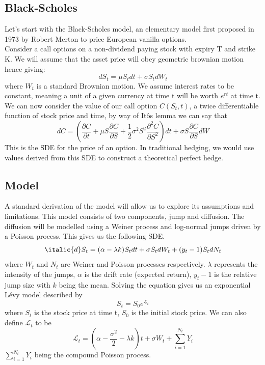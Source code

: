 \documentclass[12pt]{article}
\numberwithin{equation}{section}
\begin{document}
\subsection{Black-Scholes}
Let's start with the Black-Scholes model, an elementary model first proposed in 
1973 by Robert Merton to price European vanilla options. \autocite{blackscholes} \\
Consider a call options on a non-dividend paying stock with expiry T and strike K. 
We will assume that the asset price will obey geometric brownian motion hence 
giving: 
\begin{equation}
dS_t = \mu {S_t} dt + \sigma S_t dW_t
\end{equation}
where $W_t$ is a standard Brownian motion. We assume interest rates to be constant,
meaning a unit of a given currency at time t will be worth $e^{rt}$ at time t.\\
We can now consider the value of our call option $C(S_t,t)$, a twice differentiable 
function of stock price and time, by way of It\^{o}s 
lemma
we can say that 
\begin{equation}
dC = \left( \frac{\partial C}{\partial t} + \mu S \frac{\partial C}{\partial S} + \frac{1}{2} \sigma^2 S^2 \frac{\partial^2 C}{\partial S^2} \right) dt + \sigma S \frac{\partial C}{\partial S} dW
\end{equation}
This is the SDE for the price of an option. In traditional hedging, we would use 
values derived from this SDE to construct a theoretical perfect hedge. 
\subsection{Model}
A standard derivation of the model will allow us to explore its assumptions and 
limitations. This model consists of two components, jump and diffusion. The 
diffusion will be modelled using a Weiner process and log-normal jumps driven 
by a Poisson process\autocite{matsuda}. This gives us the following
SDE. 
\begin{equation}
  \italic{d}S_t = (\alpha - \lambda k)S_tdt + \sigma S_t dW_t + (y_t-1)S_tdN_t
\end{equation}
where $W_t \text{ and } N_t$ are Weiner and Poisson processes respectively. 
$\lambda$ represents the intensity of the jumps, $\alpha$ is the drift rate
(expected return), $y_t - 1$ is the relative jump size with $k$ being the mean. 
Solving the equation gives us an exponential L\'{e}vy model described by 
\begin{equation}
  S_t = S_0e^{\mathcal{L}_t}
\end{equation}
where $S_t$ is the stock price at time t, $S_0$ is the initial stock price. 
We can also define $\mathcal{L}_t$ to be 
\begin{equation}
  \mathcal{L}_t = (\alpha - \frac{\sigma^2}{2}-\lambda k)t + \sigma W_t + 
  \sum^{N_t}_{i=1}Y_i
\end{equation}
$\sum_{i=1}^{N_t}Y_i$ being the compound Poisson process. 
\end{document}
